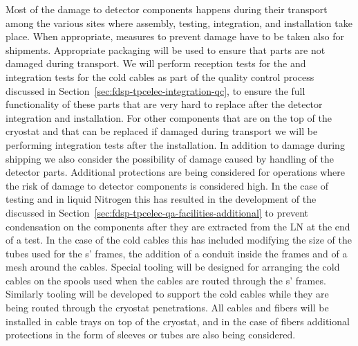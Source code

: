 Most of the damage to detector components happens during their
transport among the various sites where assembly, testing, integration,
and installation take place. When appropriate, measures to prevent
 damage have to be taken also for shipments. Appropriate 
packaging will be used to ensure that parts are not damaged
during transport. We will perform reception tests for the 
 and integration tests for the cold cables as
part of the quality control process discussed in 
Section~\ref{sec:fdsp-tpcelec-integration-qc}, to ensure the 
full functionality of these parts that are very hard to replace 
after the detector integration and installation. For other 
components that are on the top of the cryostat and that
can be replaced if damaged during transport we will be
performing integration tests after the installation. 
In addition to damage during shipping we also consider the
possibility of damage caused by handling of the detector parts.
Additional protections are being considered for operations where
the risk of damage to  detector components is
considered high. In the case of testing  and  
in liquid Nitrogen this has resulted in the development of the
 discussed in Section~\ref{sec:fdsp-tpcelec-qa-facilities-additional}
to prevent condensation on the components after they are extracted from
the LN at the end of a test. In the case of the cold cables this 
has included modifying the size of the tubes used for the s' frames,
the addition of a conduit inside the frames and of a mesh around 
the cables. Special tooling will be designed for arranging the
cold cables on the spools used when the cables are routed through
the s' frames. Similarly tooling will be developed to 
support the cold cables while they are being routed through the 
cryostat penetrations. All cables and fibers will
be installed in cable trays on top of the cryostat, and in the case
of fibers additional protections in the form of sleeves or tubes 
are also being considered. 


